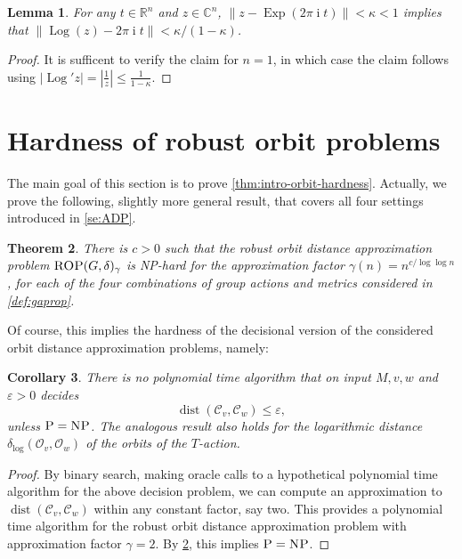 \documentclass[10pt,a4paper]{article}
\newtheorem{theorem}{Theorem}[section]
\newtheorem{lemma}[theorem]{Lemma}
\newtheorem{corollary}[theorem]{Corollary}
\theoremstyle{definition}
\DeclareMathOperator{\ii}{i}
\DeclareMathOperator{\Log}{Log}
\DeclareMathOperator{\Exp}{Exp}
\DeclareMathOperator{\dist}{dist}
\newcommand{\distLD}{\delta_{\log}}
\newcommand{\CC}{\mathbb{C}}
\newcommand{\RR}{\mathbb{R}}
\newcommand{\OO}{\ensuremath{\mathcal{O}}}
\newcommand{\KK}{\ensuremath{\mathcal{C}}}
\numberwithin{equation}{section}
\begin{document}

\begin{lemma}\label{le:Lipsch-log}
For any $t\in\RR^n$ and $z\in\CC^n$,
$\|z- \Exp(2\pi\ii t)\| < \kappa<1$ implies that
$\|\Log(z)- 2\pi\ii t \| < \kappa/(1-\kappa)$.
\end{lemma}

\begin{proof}
It is sufficent to verify the claim for $n=1$, in which case the claim follows using $|\Log' z| = |\frac{1}{z}| \le \frac{1}{1-\kappa}$.
\end{proof}


\section{Hardness of robust orbit problems} \label{sec:hardness}

The main goal of this section is to prove \cref{thm:intro-orbit-hardness}.
Actually, we prove the following, slightly more general result,
that covers all four settings introduced in \cref{se:ADP}.


\begin{theorem}
\label{thm:rop-is-hard}
There is $c>0$ such that the robust orbit distance approximation problem
$\textsc{ROP}(G,\delta)_{\gamma}$ is \textsc{NP}-hard for the approximation
factor $\gamma(n)= n^{c/\log\log n}$,
for each of the four combinations of group actions and metrics
considered in \cref{def:gaprop}.
\end{theorem}


Of course, this implies the hardness of the decisional version of the considered orbit distance approximation problems, namely:

\begin{corollary}
There is no polynomial time algorithm that on input $M,v,w$ and $\varepsilon > 0$ decides
\[
	\dist(\KK_v,\KK_w)\leq \varepsilon,
\]
unless $\textsc{P}=\textsc{NP}$. The analogous result also holds
for the logarithmic distance
$\distLD(\OO_v,\OO_w)$ of the orbits of the $T$-action.
\end{corollary}

\begin{proof}
By binary search, making oracle calls to a hypothetical polynomial time algorithm for the above
decision problem, we can compute an approximation to $\dist(\KK_v,\KK_w)$ within any constant factor, say two.
This provides a polynomial time algorithm for
the robust orbit distance approximation problem
with approximation factor $\gamma=2$.
By \cref{thm:rop-is-hard}, this implies $\textsc{P}=\textsc{NP}$.
\end{proof}
\end{document}

